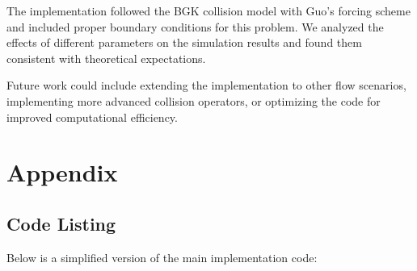 \documentclass[12pt]{article}
\begin{document}
The implementation followed the BGK collision model with Guo's forcing scheme and included proper boundary conditions for this problem. We analyzed the effects of different parameters on the simulation results and found them consistent with theoretical expectations.

Future work could include extending the implementation to other flow scenarios, implementing more advanced collision operators, or optimizing the code for improved computational efficiency.

\section{Appendix}
\subsection{Code Listing}
Below is a simplified version of the main implementation code:
\end{document}
